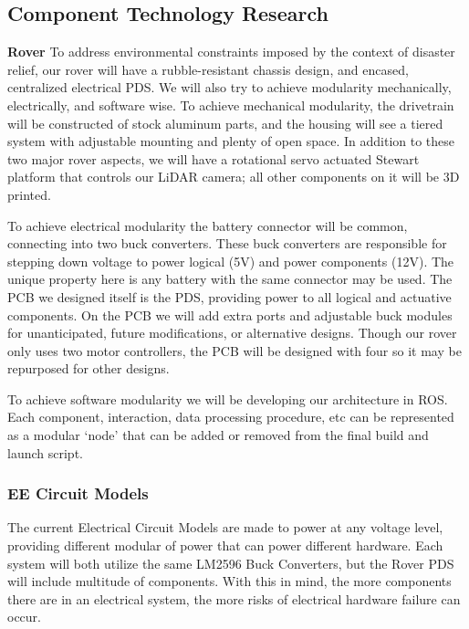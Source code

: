 \documentclass[a4paper, 10pt]{article}
\begin{document}
 	\subsection{Component Technology Research}
 	\textbf{Rover}
 	To address environmental constraints imposed by the context of disaster relief, our rover will have a rubble-resistant chassis design, and encased, centralized electrical PDS. We will also try to achieve modularity mechanically, electrically, and software wise. To achieve mechanical modularity, the drivetrain will be constructed of stock aluminum parts, and the housing will see a tiered system with adjustable mounting and plenty of open space. In addition to these two major rover aspects, we will have a rotational servo actuated Stewart platform that controls our LiDAR camera; all other components on it will be 3D printed.
 	
 	To achieve electrical modularity the battery connector will be common, connecting into two buck converters. These buck converters are responsible for stepping down voltage to power logical (5V) and power components (12V). The unique property here is any battery with the same connector may be used. The PCB we designed itself is the PDS, providing power to all logical and actuative components. On the PCB we will add extra ports and adjustable buck modules for unanticipated, future modifications, or alternative designs. Though our rover only uses two motor controllers, the PCB will be designed with four so it may be repurposed for other designs. 
 	
 	To achieve software modularity we will be developing our architecture in ROS. Each component, interaction, data processing procedure, etc can be represented as a modular `node' that can be added or removed from the final build and launch script.
 		
 		\subsubsection{EE Circuit Models}
    The current Electrical Circuit Models are made to power at any voltage level, providing different modular of power that can power different hardware. Each system will both utilize the same LM2596 Buck Converters, but the Rover PDS will include multitude of components. With this in mind, the more components there are in an electrical system, the more risks of electrical hardware failure can occur. 
\end{document}
